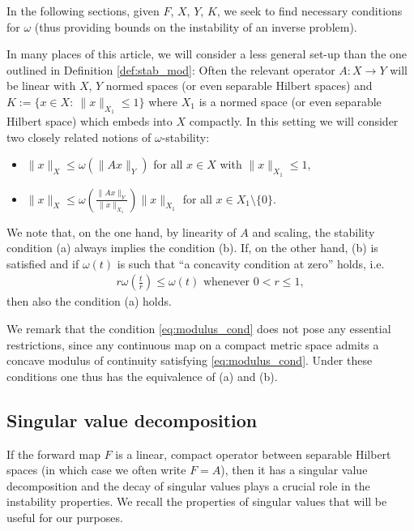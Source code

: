 \documentclass[12pt,twoside]{amsart}
\numberwithin{equation}{section}
\renewcommand{\leq}{\leqslant}
\begin{document}
In the following sections, given $F$, $X$, $Y$, $K$, we seek to find necessary conditions for $\omega$ (thus providing bounds on the instability of an inverse problem).

In many places of this article, we will consider a less general set-up than the one outlined in Definition \ref{def:stab_mod}: Often the relevant operator $A:X\rightarrow Y$ will be linear with $X$, $Y$ normed spaces (or even separable Hilbert spaces) and $K:=\{x\in X: \ \|x\|_{X_1} \leq 1\}$ where $X_1$ is a normed space (or even separable Hilbert space) which embeds into $X$ compactly. In this setting we will consider two closely related notions of $\omega$-stability:
\begin{itemize}
\item[(a)] $\|x\|_{X}\leq \omega(\|A x\|_{Y})$ for all $x\in X$ with $\|x\|_{X_1}\leq 1$,
\item[(b)] $\|x\|_{X} \leq \omega\left( \frac{\|Ax\|_{Y}}{\|x\|_{X_1}} \right) \|x\|_{X_1}$ for all $x \in X_1 \setminus \{0\}$.
\end{itemize}
We note that, on the one hand, by linearity of $A$ and scaling, the stability condition (a) always  implies the condition (b). If, on the other hand, (b) is satisfied and if $\omega(t)$ is such that ``a concavity condition at zero'' holds, i.e.
\begin{align}
\label{eq:modulus_cond}
r \omega \left(\frac{t}{r} \right) \leq \omega(t) \mbox{ whenever } 0 < r \leq 1,
\end{align}
then also the condition (a) holds. 

We remark that the condition \eqref{eq:modulus_cond} does not pose any essential restrictions, since any continuous map on a compact metric space admits a concave modulus of continuity satisfying \eqref{eq:modulus_cond}. Under these conditions one thus has the equivalence of (a) and (b).




\subsection{Singular value decomposition}

If the forward map $F$ is a linear, compact operator between separable Hilbert spaces (in which case we often write $F = A$), then it has a singular value decomposition and the decay of singular values plays a crucial role in the instability properties. We recall the properties of singular values that will be useful for our purposes.
\end{document}

